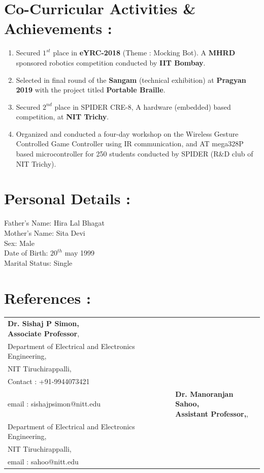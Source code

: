 \documentclass[a4paper, 12 pt]{article}
\begin{document}
\section*{Co-Curricular Activities \& Achievements :}
\begin{enumerate}
\item Secured $1^{st}$ place in {\bf  eYRC-2018} (Theme : Mocking Bot). A {\bf MHRD} sponsored robotics competition conducted by {\bf IIT Bombay}.
\item Selected in final round of the {\bf Sangam} (technical exhibition) at {\bf Pragyan 2019} with the project titled {\bf Portable Braille}.
\item Secured $2^{nd}$ place in SPIDER CRE-8, A hardware (embedded) based competition, at {\bf NIT Trichy}.
\item Organized and conducted a four-day workshop on the Wireless Gesture Controlled Game Controller using IR communication, and AT mega328P based microcontroller for 250 students conducted by SPIDER (R\&D club of NIT Trichy).
\end{enumerate}
\section*{Personal Details :}
\hspace{1cm}Father's Name: Hira Lal Bhagat\\
\hspace{1cm}Mother's Name: Sita Devi\\
\hspace{1cm}Sex: Male\\
\hspace{1cm}Date of Birth: $20^{th}$ may 1999\\
\hspace{1cm}Marital Status: Single
\section*{References :}
\begin{table}[h]
\begin{tabular}{p{8 cm}|p{8cm}}
\centering {\bf Dr. Sishaj P Simon,\\Associate Professor},\\Department of Electrical and Electronics Engineering,\\ NIT Tiruchirappalli,\\ Contact : +91-9944073421\\email : sishajpsimon@nitt.edu &\centering  {\bf Dr. Manoranjan Sahoo,\\Assistant Professor,},\\Department of Electrical and Electronics Engineering,\\ NIT Tiruchirappalli,\\ email : sahoo@nitt.edu
\end{tabular}
\end{table}
\end{document}

